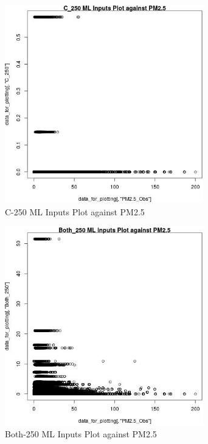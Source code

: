 \begin{figure} 
\centering  
\includegraphics[width=0.77\textwidth]{Code_Outputs/ML_input_report_ML_input_PM25_Step5_part_d_de_duplicated_aves_ML_input_C_250vPM25_Obs.jpg} 
\caption{\label{fig:ML_input_report_ML_input_PM25_Step5_part_d_de_duplicated_aves_ML_inputC_250vPM25_Obs}C-250 ML Inputs Plot against PM2.5} 
\end{figure} 
 

\begin{figure} 
\centering  
\includegraphics[width=0.77\textwidth]{Code_Outputs/ML_input_report_ML_input_PM25_Step5_part_d_de_duplicated_aves_ML_input_Both_250vPM25_Obs.jpg} 
\caption{\label{fig:ML_input_report_ML_input_PM25_Step5_part_d_de_duplicated_aves_ML_inputBoth_250vPM25_Obs}Both-250 ML Inputs Plot against PM2.5} 
\end{figure} 
 


